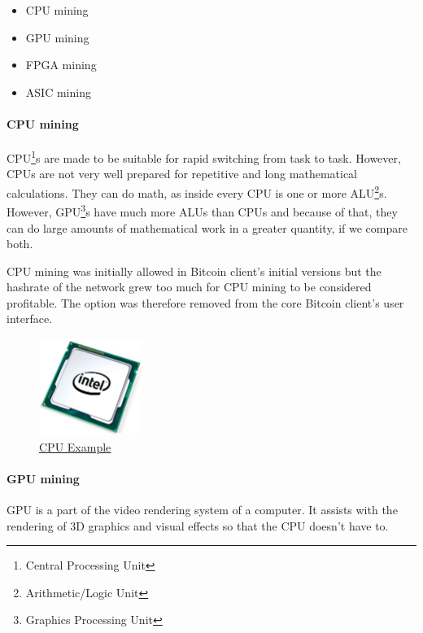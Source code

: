 \documentclass{article}
\newcommand\tab[1][1cm]{\hspace*{#1}}
\begin{document}
\begin{itemize}
 \item CPU mining
 \item GPU mining
 \item FPGA mining
 \item ASIC mining
\end{itemize}

\paragraph{CPU mining}

\tab CPU\footnote{Central Processing Unit}s are made to be suitable for rapid switching from task to task. However, CPUs are not very well prepared for repetitive and long mathematical calculations. They can do math, as inside every CPU is one or more ALU\footnote{Arithmetic/Logic Unit}s. However, GPU\footnote{Graphics Processing Unit}s have much more ALUs than CPUs and because of that, they can do large amounts of mathematical work in a greater quantity, if we compare both.

CPU mining was initially allowed in Bitcoin client’s initial versions but the hashrate of the network grew too much for CPU mining to be considered profitable. The option was therefore removed from the core Bitcoin client's user interface.

\begin{figure}[H]
    \begin{center}
        \includegraphics[width=0.3\textwidth]{images/cpu.jpeg}
        \caption{\href{https://www.pugetsystems.com/labs/articles/Estimating-CPU-Performance-using-Amdahls-Law-619/}{\underline{CPU Example}}}
    \end{center}
\end{figure}

\paragraph{GPU mining}

\tab GPU is a part of the video rendering system of a computer. It assists with the rendering of 3D graphics and visual effects so that the CPU doesn't have to.
\end{document}

